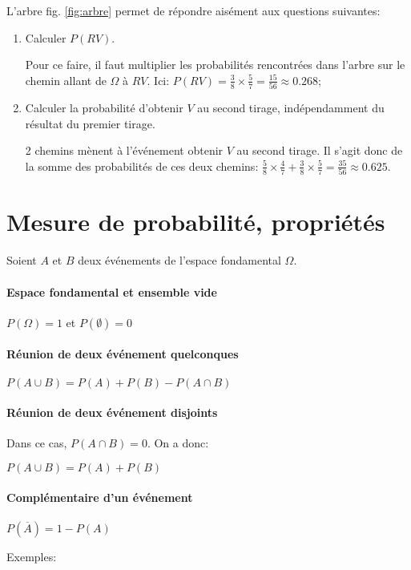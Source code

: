 \documentclass[a4paper,12pt]{scrartcl}
\begin{document}
L'arbre fig. \ref{fig:arbre} permet de répondre aisément aux questions suivantes:

\begin{enumerate}
 \item Calculer $P(RV)$. 
 
 Pour ce faire, il faut multiplier les probabilités rencontrées dans l'arbre sur le chemin allant de $\Omega$ à $RV$. Ici: $P(RV) = \frac{3}{8} \times \frac{5}{7} = \frac{15}{56} \approx 0.268$;
 \item Calculer la probabilité d'obtenir $V$ au second tirage, indépendamment du résultat du premier tirage.
 
 2 chemins mènent à l'événement \og{}obtenir $V$ au second tirage\fg{}. Il s'agit donc de la somme des probabilités de ces deux chemins: $\frac{5}{8} \times \frac{4}{7} + \frac{3}{8} \times \frac{5}{7} = \frac{35}{56} \approx 0.625$.
\end{enumerate}

\section{Mesure de probabilité, propriétés}

Soient $A$ et $B$ deux événements de l'espace fondamental $\Omega$.

\paragraph{Espace fondamental et ensemble vide}
$P(\Omega) = 1$ et $P(\emptyset) = 0$

\paragraph{Réunion de deux événement quelconques}
$P(A \cup B) = P(A) + P(B) - P(A \cap B)$

\paragraph{Réunion de deux événement disjoints}
Dans ce cas, $P(A \cap B) = 0$. On a donc:

$P(A \cup B) = P(A) + P(B)$

\paragraph{Complémentaire d'un événement}
$P(\overline{A}) = 1 - P(A)$

Exemples:
\end{document}
